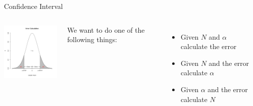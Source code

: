 \begin{frame}{Confidence Interval}

  \begin{columns}

    \centerline{\includegraphics[width=4cm]{img/confidenceInterval}}


    We want to do one of the following things:
    \begin{itemize}
    \item Given $N$ and $\alpha$ calculate the error
    \item Given $N$ and the error calculate $\alpha$
    \item Given $\alpha$ and the error calculate $N$
    \end{itemize}

  \end{columns}
  
\end{frame}


